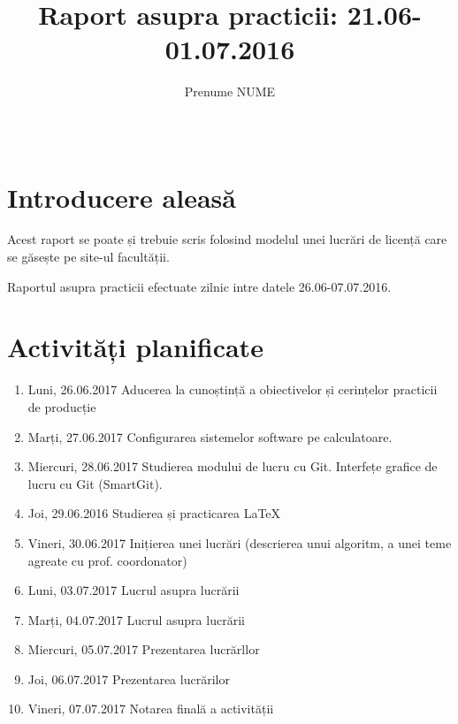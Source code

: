 \documentclass{report}
\title{{\sc Raport asupra practicii: 21.06-01.07.2016}}
\author{Prenume NUME}
\date{\,}
\begin{document}
\maketitle

\tableofcontents

\chapter{Introducere aleasă}

Acest raport se poate și trebuie scris folosind modelul unei lucrări de licență care se găsește pe site-ul facultății. 

\vskip 0.5cm

Raportul asupra practicii efectuate zilnic intre datele 26.06-07.07.2016. 

\chapter{Activități planificate}
\begin{enumerate}
\item  Luni, 26.06.2017 \newline
Aducerea la cunoștință a obiectivelor și cerințelor practicii de producție
\item  Marți, 27.06.2017 \newline
Configurarea sistemelor software pe calculatoare. 
\item  Miercuri, 28.06.2017 \newline
Studierea modului de lucru cu Git. Interfețe grafice de lucru cu Git (SmartGit).
\item  Joi, 29.06.2016 \newline
Studierea și practicarea LaTeX
\item  Vineri, 30.06.2017  \newline
Inițierea unei lucrări (descrierea unui algoritm, a unei teme agreate cu prof. coordonator)
\item  Luni, 03.07.2017  \newline
Lucrul asupra lucrării
\item  Marți, 04.07.2017  \newline
Lucrul asupra lucrării
\item  Miercuri, 05.07.2017  \newline
Prezentarea lucrărllor
\item  Joi, 06.07.2017  \newline
Prezentarea lucrărilor
\item  Vineri, 07.07.2017  \newline
Notarea finală a activității
\end{enumerate}
\end{document}
